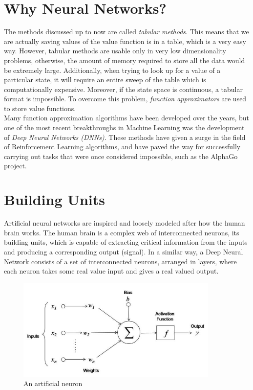 \label{ch:DNN}
\section{Why Neural Networks?}

The methods discussed up to now are called \textit{tabular methods}. This means that we are actually saving values of the value function is in a table, which is a very easy way. However, tabular methods are usable only in very low dimensionality problems, otherwise, the amount of memory required to store all the data would be extremely large. Additionally, when trying to look up for a value of a particular state, it will require an entire sweep of the table which is computationally expensive. Moreover, if the state space is continuous, a tabular format is impossible. To overcome this problem, \textit{function approximators} are used to store value functions.
\\
\indent Many function approximation algorithms have been developed over the years, but one of the most recent breakthroughs in Machine Learning was the development of \textit{Deep Neural Networks (DNNs)}. These methods have given a surge in the field of Reinforcement Learning algorithms, and have paved the way for successfully carrying out tasks that were once considered impossible, such as the AlphaGo project\cite{silver2017mastering}.

\section{Building Units}

	Artificial neural networks are inspired and loosely modeled after how the human brain works. The human brain is a complex web of interconnected neurons, its building units, which is capable of extracting critical information from the inputs and producing a corresponding output (signal). In a similar way, a Deep Neural Network consists of a set of interconnected neurons, arranged in layers, where each neuron takes some real value input and gives a real valued output. 

\begin{figure}
	\centering
	\includegraphics[width=10cm]{images/NeuronDiagram}
	\caption{An artificial neuron}
	\label{fig:neuron}
	

\end{figure}


